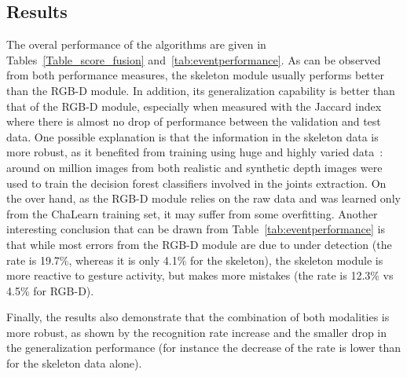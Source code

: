 \subsection{Results}\label{sec:results}


%
The overal performance of the algorithms are given in Tables~\ref{Table_score_fusion} and~\ref{tab:eventperformance}.
%
As can be observed from both performance measures, the skeleton module usually  performs better than the RGB-D module.
In addition, its generalization capability  is better than that of the RGB-D module,
especially when measured with the Jaccard index where there is almost no drop of performance between the validation and test data.
%
One possible explanation is that the information in the skeleton data is more robust, as it benefited from training using huge and highly
varied data~\cite{shotton2011real}: around on million images from both realistic and synthetic depth images were used to train
the decision forest classifiers involved in the joints extraction.
%
On the over hand, as the  RGB-D module relies on  the raw data and was learned only from the ChaLearn training set, it may
suffer from some overfitting.
%
Another interesting conclusion that can be drawn from Table~\ref{tab:eventperformance} is that while most errors from the RGB-D module are due to under detection
(the \eventmissed rate is 19.7\%, whereas it is only 4.1\% for the skeleton), the skeleton module is more reactive to gesture activity, but makes more mistakes
(the \eventconfused rate is 12.3\% vs 4.5\% for RGB-D).


Finally, the results also demonstrate  that the combination of both modalities is more robust,
as shown by the recognition rate increase and the smaller drop in the generalization performance
(for instance the decrease of the \eventaccuracy rate is lower than for the skeleton data alone).



